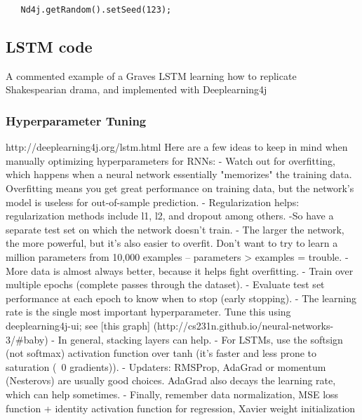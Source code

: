 {\begin{lstlisting}
   Nd4j.getRandom().setSeed(123);
\end{lstlisting}

\subsection{LSTM code}
A commented example of a Graves LSTM learning how to replicate Shakespearian drama, and implemented with Deeplearning4j
\subsubsection{Hyperparameter Tuning}
http://deeplearning4j.org/lstm.html
Here are a few ideas to keep in mind when manually optimizing hyperparameters for RNNs:
   - Watch out for overfitting, which happens when a neural network essentially "memorizes" the training data. Overfitting means you get great performance on training data, but the network’s model is useless for out-of-sample prediction.
   - Regularization helps: regularization methods include l1, l2, and dropout among others.
    -So have a separate test set on which the network doesn’t train.
   - The larger the network, the more powerful, but it’s also easier to overfit. Don’t want to try to learn a million parameters from 10,000 examples – parameters > examples = trouble.
  -  More data is almost always better, because it helps fight overfitting.
  -  Train over multiple epochs (complete passes through the dataset).
   - Evaluate test set performance at each epoch to know when to stop (early stopping).
  -  The learning rate is the single most important hyperparameter. Tune this using deeplearning4j-ui; see [this graph] (http://cs231n.github.io/neural-networks-3/\#baby)
  -  In general, stacking layers can help.
  -  For LSTMs, use the softsign (not softmax) activation function over tanh (it’s faster and less prone to saturation (~0 gradients)).
  -  Updaters: RMSProp, AdaGrad or momentum (Nesterovs) are usually good choices. AdaGrad also decays the learning rate, which can help sometimes.
   - Finally, remember data normalization, MSE loss function + identity activation function for regression, Xavier weight initialization


} %